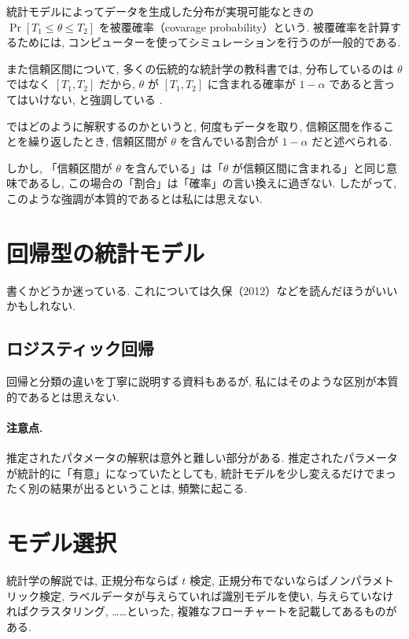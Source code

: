 \documentclass[a4paper, 12pt]{jarticle}
\begin{document}
統計モデルによってデータを生成した分布が実現可能なときの $\Pr[T_1 \le \theta\le T_2]$ を被覆確率（covarage probability）という.
被覆確率を計算するためには, コンピューターを使ってシミュレーションを行うのが一般的である.
 
また信頼区間について, 多くの伝統的な統計学の教科書では, 分布しているのは $\theta$ ではなく $[T_1, T_2]$ だから, $\theta$ が $[T_1, T_2]$ に含まれる確率が $1-\alpha$ であると言ってはいけない, と強調している . 

ではどのように解釈するのかというと, 何度もデータを取り, 信頼区間を作ることを繰り返したとき, 信頼区間が $\theta$ を含んでいる割合が $1-\alpha$ だと述べられる.

しかし, 「信頼区間が $\theta$ を含んでいる」は「$\theta$ が信頼区間に含まれる」と同じ意味であるし, この場合の「割合」は「確率」の言い換えに過ぎない. したがって, このような強調が本質的であるとは私には思えない. 

\section{回帰型の統計モデル}

書くかどうか迷っている. これについては久保（2012）などを読んだほうがいいかもしれない.

\subsection{ロジスティック回帰}

回帰と分類の違いを丁寧に説明する資料もあるが, 私にはそのような区別が本質的であるとは思えない. 


\paragraph{注意点.} 推定されたパタメータの解釈は意外と難しい部分がある. 
推定されたパラメータが統計的に「有意」になっていたとしても, 統計モデルを少し変えるだけでまったく別の結果が出るということは, 頻繁に起こる. 

\section{モデル選択}

統計学の解説では, 正規分布ならば $t$ 検定, 正規分布でないならばノンパラメトリック検定, ラベルデータが与えらていれば識別モデルを使い, 与えらていなければクラスタリング, ……といった, 複雑なフローチャートを記載してあるものがある. 
\end{document}
